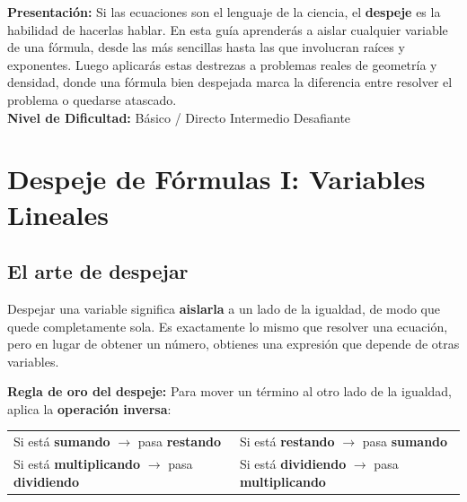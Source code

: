 \documentclass[12pt, a4paper]{article}
\begin{document}


\vspace{4pt}
\begin{cuadroinfo}
\small
\textbf{Presentación:} Si las ecuaciones son el lenguaje de la ciencia, el \textbf{despeje} es la habilidad de hacerlas hablar. En esta guía aprenderás a aislar cualquier variable de una fórmula, desde las más sencillas hasta las que involucran raíces y exponentes. Luego aplicarás estas destrezas a problemas reales de geometría y densidad, donde una fórmula bien despejada marca la diferencia entre resolver el problema o quedarse atascado.
\\[4pt]
\textbf{Nivel de Dificultad:}\quad
\facil{} Básico / Directo \quad
\medio{} Intermedio \quad
\dificil{} Desafiante
\end{cuadroinfo}

\vspace{8pt}

\section{Despeje de Fórmulas I: Variables Lineales}

\subsection{El arte de despejar}

Despejar una variable significa \textbf{aislarla} a un lado de la igualdad, de modo que quede completamente sola. Es exactamente lo mismo que resolver una ecuación, pero en lugar de obtener un número, obtienes una expresión que depende de otras variables.

\begin{cuadroteoria}
\textbf{Regla de oro del despeje:} Para mover un término al otro lado de la igualdad, aplica la \textbf{operación inversa}:
\begin{center}
\begin{tabular}{ll}
Si está \textbf{sumando} $\longrightarrow$ pasa \textbf{restando} & Si está \textbf{restando} $\longrightarrow$ pasa \textbf{sumando} \\
Si está \textbf{multiplicando} $\longrightarrow$ pasa \textbf{dividiendo} & Si está \textbf{dividiendo} $\longrightarrow$ pasa \textbf{multiplicando}
\end{tabular}
\end{center}
\end{cuadroteoria}
\end{document}
